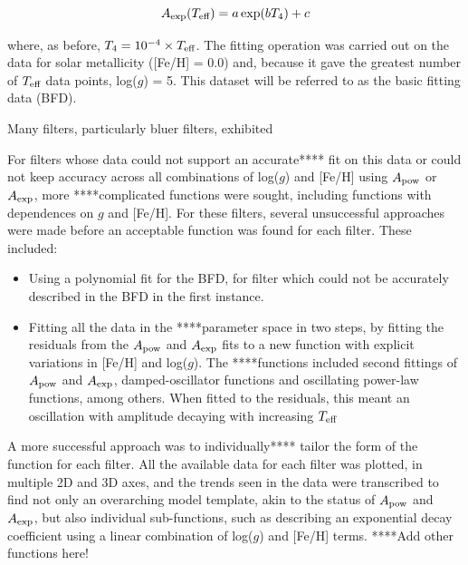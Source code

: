 \documentclass[12pt, a4paper]{report}
\begin{document}
\begin{equation}
A_{\textnormal{exp}} (T_{\textnormal{eff}}) = a \exp(b T_{4}) + c
\label{Teff_exp}
\end{equation}

where, as before, $T_{4} = 10^{-4} \times T_{\textnormal{eff}}$. The fitting operation was carried out on the data for solar metallicity ([Fe/H] = 0.0) and, because it gave the greatest number of $T_{\textnormal{eff}}$ data points, log($g$) = 5. This dataset will be referred to as the basic fitting data (BFD).

Many filters, particularly bluer filters, exhibited

For filters whose data could not support an accurate**** fit on this data or could not keep accuracy across all combinations of log($g$) and [Fe/H] using $A_{\textnormal{pow}}$ or $A_{\textnormal{exp}}$, more ****complicated functions were sought, including functions with dependences on $g$ and [Fe/H].
For these filters, several unsuccessful approaches were made before an acceptable function was found for each filter. These included:
\begin{itemize}
\item Using a polynomial fit for the BFD, for filter which could not be accurately described in the BFD in the first instance.
\item Fitting all the data in the ****parameter space in two steps, by fitting the residuals from the $A_{\textnormal{pow}}$ and $A_{\textnormal{exp}}$ fits to a new function with explicit variations in [Fe/H] and log($g$). The ****functions included second fittings of $A_{\textnormal{pow}}$ and $A_{\textnormal{exp}}$, damped-oscillator functions and oscillating power-law functions, among others. When fitted to the residuals, this meant an oscillation with amplitude decaying with increasing $T_{\textnormal{eff}}$
\end{itemize}


A more successful approach was to individually**** tailor the form of the function for each filter. All the available data for each filter was plotted, in multiple 2D and 3D axes, and the trends seen in the data were transcribed to find not only an overarching model template, akin to the status of $A_{\textnormal{pow}}$ and $A_{\textnormal{exp}}$, but also individual sub-functions, such as describing an exponential decay coefficient using a linear combination of log($g$) and [Fe/H] terms.
****Add other functions here!
\end{document}
